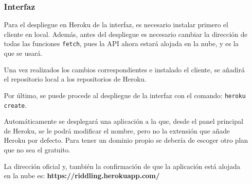 \subsubsection{Interfaz}

Para el despliegue en Heroku de la interfaz, es necesario instalar primero el cliente en local\cite{heroku}. Además, antes del despliegue es necesario cambiar la dirección de todas las funciones \texttt{fetch}, pues la API ahora estará alojada en la nube, y es la que se usará.

Una vez realizados los cambios correspondientes e instalado el cliente, se añadirá el repositorio local a los repositorios de Heroku\cite{heroku2}. 

Por último, se puede procede al despliegue de la interfaz con el comando: \texttt{heroku create}.

Automáticamente se desplegará una aplicación a la que, desde el panel principal de Heroku, se le podrá modificar el nombre, pero no la extensión que añade Heroku por defecto. Para tener un dominio propio se debería de escoger otro plan que no sea el gratuito.

La dirección oficial y, también la confirmación de que la aplicación está alojada en la nube es: \textbf{https://riddling.herokuapp.com/}